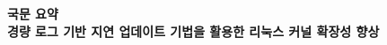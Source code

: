 \documentclass[doctor,korean,final]{kmu}
\begin{document}




\newif\ifkor
\kortrue 





\setcounter{page}{\value{pagemarker}}         %

\tableofcontents
\listoffigures

\setcounter{page}{\value{pagemarker}}         %
\label{paperlastromanpagelabel}     %

\hfill \break


\noindent
\Large{\textbf{국문 요약}}
\newline
\\
\noindent
\Large{\textbf{경량 로그 기반 지연 업데이트 기법을 활용한 리눅스 커널 확장성 향상}}
\end{document}
